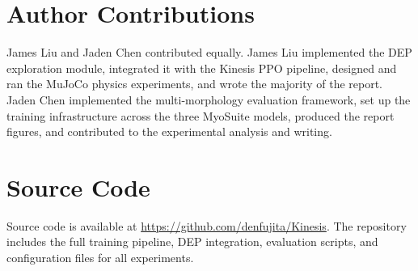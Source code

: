 \documentclass[10pt,twocolumn]{article}
\begin{document}
\section*{Author Contributions}
James Liu and Jaden Chen contributed equally. James Liu implemented the DEP exploration module, integrated it with the Kinesis PPO pipeline, designed and ran the MuJoCo physics experiments, and wrote the majority of the report. Jaden Chen implemented the multi-morphology evaluation framework, set up the training infrastructure across the three MyoSuite models, produced the report figures, and contributed to the experimental analysis and writing.

\section*{Source Code}
Source code is available at \url{https://github.com/denfujita/Kinesis}. The repository includes the full training pipeline, DEP integration, evaluation scripts, and configuration files for all experiments.
\end{document}
